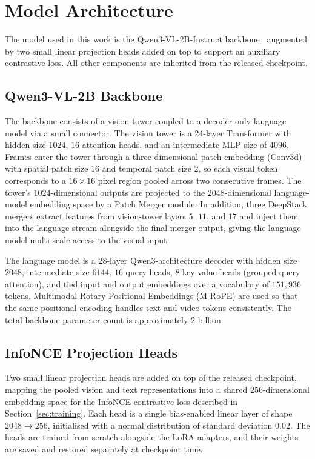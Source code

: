 \documentclass{article}
\begin{document}
\section{Model Architecture}
\label{sec:architecture}

The model used in this work is the Qwen3-VL-2B-Instruct
backbone~\cite{qwen3vl2025} augmented by two small linear projection heads
added on top to support an auxiliary contrastive loss. All other components
are inherited from the released checkpoint.

\subsection{Qwen3-VL-2B Backbone}
\label{sec:arch-backbone}

The backbone consists of a vision tower coupled to a decoder-only language
model via a small connector. The vision tower is a 24-layer Transformer with
hidden size $1024$, $16$ attention heads, and an intermediate MLP size of
$4096$. Frames enter the tower through a three-dimensional patch embedding
(Conv3d) with spatial patch size $16$ and temporal patch size $2$, so each
visual token corresponds to a $16 \times 16$ pixel region pooled across two
consecutive frames. The tower's $1024$-dimensional outputs are projected to
the $2048$-dimensional language-model embedding space by a Patch Merger
module. In addition, three DeepStack mergers extract features from
vision-tower layers $5$, $11$, and $17$ and inject them into the language
stream alongside the final merger output, giving the language model
multi-scale access to the visual input.

The language model is a 28-layer Qwen3-architecture decoder with hidden size
$2048$, intermediate size $6144$, $16$ query heads, $8$ key-value heads
(grouped-query attention), and tied input and output embeddings over a
vocabulary of $151{,}936$ tokens. Multimodal Rotary Positional Embeddings
(M-RoPE) are used so that the same positional encoding handles text and video
tokens consistently. The total backbone parameter count is approximately
$2$ billion.

\subsection{InfoNCE Projection Heads}
\label{sec:arch-infonce-heads}

Two small linear projection heads are added on top of the released checkpoint,
mapping the pooled vision and text representations into a shared
$256$-dimensional embedding space for the InfoNCE contrastive loss described
in Section~\ref{sec:training}. Each head is a single bias-enabled linear
layer of shape $2048 \to 256$, initialised with a normal distribution of
standard deviation $0.02$. The heads are trained from scratch alongside the
LoRA adapters, and their weights are saved and restored separately at
checkpoint time.
\end{document}
